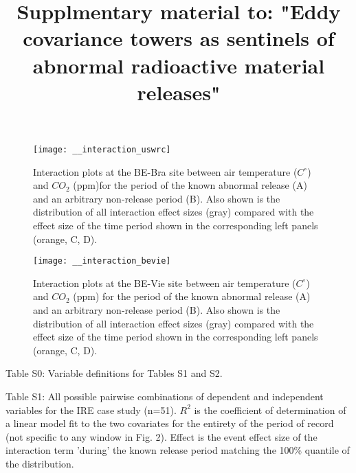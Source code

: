 \documentclass{article}
\begin{document}
\title{Supplmentary material to: "Eddy covariance towers as sentinels of abnormal radioactive material releases"}
\date{}
\maketitle


\makeatletter 
\renewcommand{\thefigure}{S\@arabic\c@figure}
\makeatother

\begin{figure}[H]
	\centering
	\texttt{[image: \_\_interaction\_uswrc]}
	\caption{Interaction plots at the BE-Bra site between air temperature ($C^{\circ}$) and $CO_2$ (ppm)for the period of the known abnormal release (A) and an arbitrary non-release period (B). Also shown is the distribution of all interaction effect sizes (gray) compared with the effect size of the time period shown in the corresponding left panels (orange, C, D).}
	\label{fig:interaction_bebra}
\end{figure}

\begin{figure}[H]
	\centering
	\texttt{[image: \_\_interaction\_bevie]}
	\caption{Interaction plots at the BE-Vie site between air temperature ($C^{\circ}$) and $CO_2$ (ppm) for the period of the known abnormal release (A) and an arbitrary non-release period (B). Also shown is the distribution of all interaction effect sizes (gray) compared with the effect size of the time period shown in the corresponding left panels (orange, C, D).}
	\label{fig:interaction_bevie}
\end{figure}


\newpage

\noindent Table S0: Variable definitions for Tables S1 and S2.


\noindent Table S1: All possible pairwise combinations of dependent and independent variables for the IRE case study (n=51). $R^2$ is the coefficient of determination of a linear model fit to the two covariates for the entirety of the period of record (not specific to any window in Fig. 2). Effect is the event effect size of the interaction term 'during' the known release period matching the 100\% quantile of the distribution.
\end{document}
